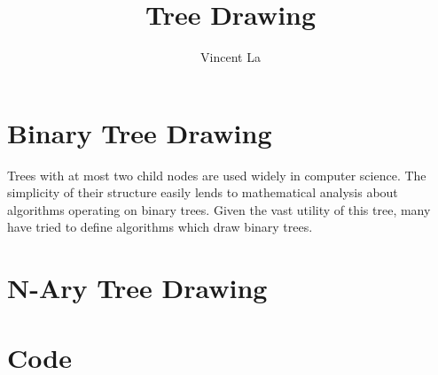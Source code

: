 \documentclass[11pt]{article}
\title{Tree Drawing}
\author{Vincent La}
\begin{document}
\maketitle

\section*{Binary Tree Drawing}
Trees with at most two child nodes are used widely in computer science. The simplicity of their structure easily lends to mathematical analysis about algorithms operating on binary trees. Given the vast utility of this tree, many have tried to define algorithms which draw binary trees.

\begin{figure}[H]
    \centering
    \def\svgwidth{\columnwidth}
    
\end{figure}

\section*{N-Ary Tree Drawing}
\section*{Code}

\end{document}
